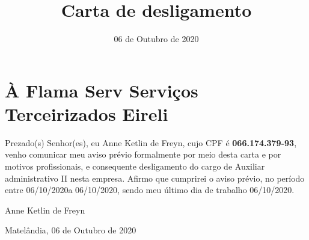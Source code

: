 \documentclass{article}
\title{Carta de desligamento}
\author{\name}
\date{06 de Outubro de 2020}
\newcommand{\name}{Anne Ketlin de Freyn}
\newcommand{\cidade}{Matelândia}
\newcommand{\empresa}{Flama Serv Serviços Terceirizados Eireli}
\newcommand{\dataHojeExtenso}{06 de Outubro de 2020}
\newcommand{\dataInicioAviso}{06/10/2020}
\newcommand{\dataFimAviso}{06/10/2020}
\begin{document}
    \maketitle
    \section*{À \empresa}
 
Prezado(s) Senhor(es), eu \name, cujo CPF é \textbf{066.174.379-93}, venho comunicar meu aviso prévio formalmente por meio desta carta e por motivos profissionais, e consequente desligamento do cargo de Auxiliar administrativo II nesta empresa. Afirmo que cumprirei o aviso prévio, no período entre \dataInicioAviso a \dataFimAviso, sendo meu último dia de trabalho \dataFimAviso.


\begin{center} \name \end{center}

\begin{center}
    \cidade, \dataHojeExtenso
\end{center}
\end{document}
